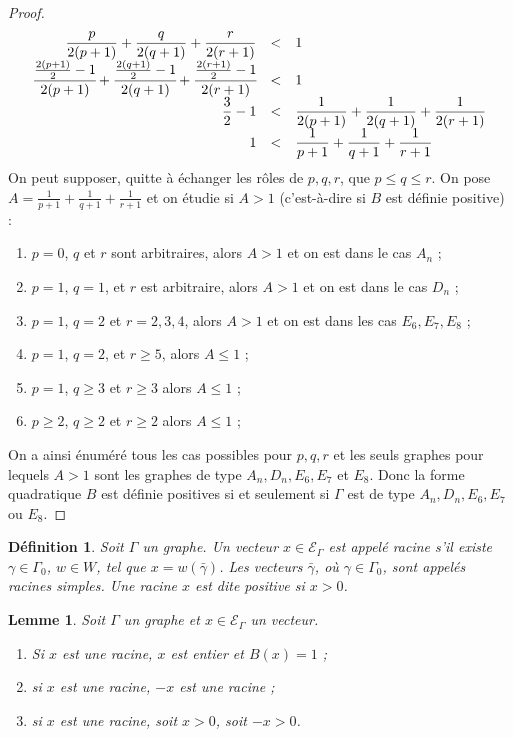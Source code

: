 \documentclass[a4paper,10pt]{article}
\newtheorem{lm}[]{Lemme}[section]
\newtheorem{defi}[]{Définition}[section]
\newcommand{\EG}{\mathscr{E}_\Gamma}
\newcommand{\dps}{\displaystyle}
\begin{document}
\begin{proof}
\[
\begin{array}{>{\dps}r>{\dps}l>{\dps}l}
	\frac{p}{2(p+1)}+\frac{q}{2(q+1)}+\frac{r}{2(r+1)}&<&1\\
	\cfrac{\frac{2(p+1)}{2}-1}{2(p+1)}+\cfrac{\frac{2(q+1)}{2}-1}{2(q+1)}+\cfrac{\frac{2(r+1)}{2}-1}{2(r+1)}&<&1\\
	\frac{3}{2}-1&<&\frac{1}{2(p+1)}+\frac{1}{2(q+1)}+\frac{1}{2(r+1)}\\
	1&<&\frac{1}{p+1}+\frac{1}{q+1}+\frac{1}{r+1}\\
\end{array}
\]
On peut supposer, quitte à échanger les rôles de $p,q,r$, que $p\leq q\leq r$. On pose $A=\frac{1}{p+1}+\frac{1}{q+1}+\frac{1}{r+1}$ et on étudie si $A>1$ (c'est-à-dire si $B$ est définie positive) :
\begin{enumerate}
	\item $p=0$, $q$ et $r$ sont arbitraires, alors $A>1$ et on est dans le cas $A_n$ ;
	\item $p=1$, $q=1$, et $r$ est arbitraire, alors $A>1$ et on est dans le cas $D_n$ ;
	\item $p=1$, $q=2$ et $r=2,3,4$, alors $A>1$ et on est dans les cas $E_6,E_7,E_8$ ;
	\item $p=1$, $q=2$, et $r\geq5$, alors $A\leq1$ ;
	\item $p=1$, $q\geq3$ et $r\geq3$ alors $A\leq1$ ;
	\item $p\geq2$, $q\geq2$ et $r\geq2$ alors $A\leq1$ ;
\end{enumerate}
On a ainsi énuméré tous les cas possibles pour $p,q,r$ et les seuls graphes pour lequels $A>1$ sont les graphes de type $A_n,D_n,E_6,E_7$ et $E_8$. Donc la forme quadratique $B$ est définie positives si et seulement si $\Gamma$ est de type $A_n,D_n,E_6,E_7$ ou $E_8$.
\end{proof}
\begin{defi}
Soit $\Gamma$ un graphe. Un vecteur $x\in\EG$ est appelé racine s'il existe $\gamma\in\Gamma_0$, $w\in W$, tel que $x=w(\bar\gamma)$. Les vecteurs $\bar\gamma$, où $\gamma\in\Gamma_0$, sont appelés racines simples. Une racine $x$ est dite positive si $x>0$.
\end{defi}
\begin{lm}
	\label{lmroot}
	Soit $\Gamma$ un graphe et $x\in\EG$ un vecteur.
	\begin{enumerate}
		\item Si $x$ est une racine, $x$ est entier et $B(x)=1$ ;
		\item si $x$ est une racine, $-x$ est une racine ;
		\item si $x$ est une racine, soit $x>0$, soit $-x>0$.
	\end{enumerate}
\end{lm}
\end{document}
